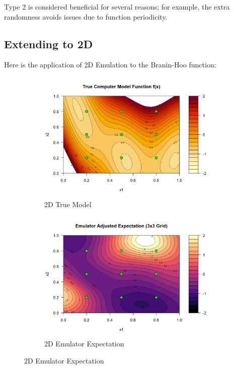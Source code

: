 \documentclass[12pt]{report} %
\begin{document}
\noindent Type 2 is considered beneficial for several reasons; for example, the extra randomness avoids issues due to function periodicity.\cite{vernon2024}

\subsection{Extending to 2D}
Here is the application of 2D Emulation to the Branin-Hoo function:

\begin{figure}[htbp]
    \centering
    \begin{subfigure}[b]{0.47\textwidth}
        \centering
        \includegraphics[width=\textwidth]{2D True Model.png}
        \caption{2D True Model}
        \label{fig:true_model}
    \end{subfigure}
    \hfill
    \begin{subfigure}[b]{0.47\textwidth}
        \centering
        \includegraphics[width=\textwidth]{2D Emulator Expectation.png}
        \caption{2D Emulator Expectation}
        \label{fig:expectation}
    \end{subfigure}


\end{figure}
\end{document}
